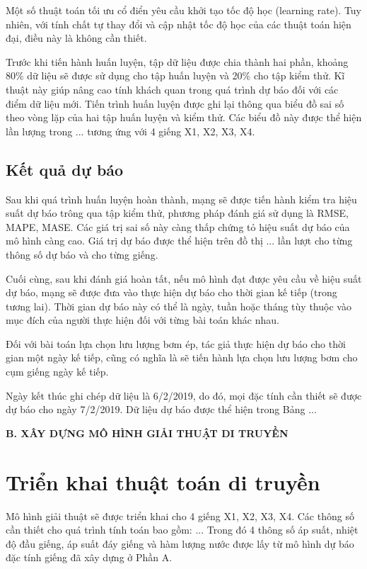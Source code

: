 \documentclass[12pt,a4paper]{report}
\begin{document}
Một số thuật toán tối ưu cổ điển yêu cầu khởi tạo tốc độ học (learning rate). Tuy nhiên, với tính chất tự thay đổi và cập nhật tốc độ học của các thuật toán hiện đại, điều này là không cần thiết.

Trước khi tiến hành huấn luyện, tập dữ liệu được chia thành hai phần, khoảng 80\% dữ liệu sẽ được sử dụng cho tập huấn luyện và 20\% cho tập kiểm thử. Kĩ thuật này giúp nâng cao tính khách quan trong quá trình dự báo đối với các điểm dữ liệu mới. Tiến trình huấn luyện được ghi lại thông qua biểu đồ sai số theo vòng lặp của hai tập huấn luyện và kiểm thử. Các biểu đồ này được thể hiện lần lượng trong ... tương ứng với 4 giếng X1, X2, X3, X4.\\

\subsection{Kết quả dự báo}
Sau khi quá trình huấn luyện hoàn thành, mạng sẽ được tiến hành kiểm tra hiệu suất dự báo trông qua tập kiểm thử, phương pháp đánh giá sử dụng là RMSE, MAPE, MASE. Các giá trị sai số này càng thấp chứng tỏ hiệu suất dự báo của mô hình càng cao. Giá trị dự báo được thể hiện trên đồ thị ... lần lượt cho từng thông số dự báo và cho từng giếng.

Cuối cùng, sau khi đánh giá hoàn tất, nếu mô hình đạt được yêu cầu về hiệu suất dự báo, mạng sẽ được đưa vào thực hiện dự báo cho thời gian kế tiếp (trong tương lai). Thời gian dự báo này có thể là ngày, tuần hoặc tháng tùy thuộc vào mục đích của người thực hiện đối với từng bài toán khác nhau.

Đối với bài toán lựa chọn lưu lượng bơm ép, tác giả thực hiện dự báo cho thời gian một ngày kế tiếp, cũng có nghĩa là sẽ tiến hành lựa chọn lưu lượng bơm cho cụm giếng ngày kế tiếp.

Ngày kết thúc ghi chép dữ liệu là 6/2/2019, do đó, mọi đặc tính cần thiết sẽ được dự báo cho ngày 7/2/2019. Dữ liệu dự báo được thể hiện trong Bảng ...

\begin{center}
	\centering
	\textbf{B. XÂY DỰNG MÔ HÌNH GIẢI THUẬT DI TRUYỀN}
\end{center}
\section{Triển khai thuật toán di truyền}
Mô hình giải thuật sẽ được triển khai cho 4 giếng X1, X2, X3, X4. Các thông số cần thiết cho quá trình tính toán bao gồm: ... Trong đó 4 thông số áp suất, nhiệt độ đầu giếng, áp suất đáy giếng và hàm lượng nước được lấy từ mô hình dự báo đặc tính giếng đã xây dựng ở Phần A.
\end{document}
